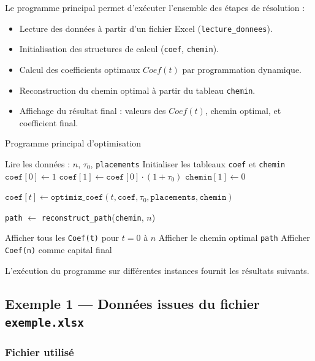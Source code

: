 \documentclass[a4paper,11pt]{article}
\begin{document}
Le programme principal permet d’exécuter l’ensemble des étapes de résolution :

\begin{itemize}
	\item Lecture des données à partir d’un fichier Excel (\texttt{lecture\_donnees}).
	\item Initialisation des structures de calcul (\texttt{coef}, \texttt{chemin}).
	\item Calcul des coefficients optimaux $Coef(t)$ par programmation dynamique.
	\item Reconstruction du chemin optimal à partir du tableau \texttt{chemin}.
	\item Affichage du résultat final : valeurs des $Coef(t)$, chemin optimal, et coefficient final.
\end{itemize}

\begin{algorithm}[H]
	\caption{Programme principal d’optimisation}
	\begin{algorithmic}[1]
		\State Lire les données : $n$, $\tau_0$, \texttt{placements} 
		\State Initialiser les tableaux \texttt{coef} et \texttt{chemin}
		\State $\texttt{coef}[0] \gets 1$
		\State $\texttt{coef}[1] \gets \texttt{coef}[0] \cdot (1 + \tau_0)$
		\State $\texttt{chemin}[1] \gets 0$
		
		\State $\texttt{coef}[t] \gets \texttt{optimiz\_coef}(t, \texttt{coef}, \tau_0, \texttt{placements}, \texttt{chemin})$
		\EndFor
		
		\State \texttt{path} $\gets$ \texttt{reconstruct\_path}(\texttt{chemin}, $n$)
		
		\State Afficher tous les \texttt{Coef(t)} pour $t = 0$ à $n$
		\State Afficher le chemin optimal \texttt{path}
		\State Afficher \texttt{Coef(n)} comme capital final
		\EndFunction
	\end{algorithmic}
\end{algorithm}


L’exécution du programme sur différentes instances fournit les résultats suivants.

\subsection{Exemple 1 — Données issues du fichier \texttt{exemple.xlsx}}

\subsubsection{Fichier utilisé}
\end{document}
